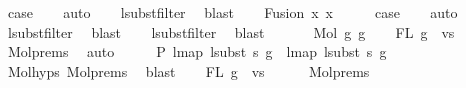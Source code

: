 \begin{isabellebody}
\ {\isacharquery}{\kern0pt}case\isanewline
\ \ \isamarkupfalse%
\ auto\isanewline
\ \ \isamarkupfalse%
\ lsubst{\isacharunderscore}{\kern0pt}filter\ \isamarkupfalse%
\ blast\isanewline
{}\isamarkupfalse%
\isanewline
\ \ \isamarkupfalse%
\ {\isacharparenleft}{\kern0pt}Fusion\ x{}\ x{}{\isacharparenright}{\kern0pt}\isanewline
\ \ \isamarkupfalse%
\ \isamarkupfalse%
\ {\isacharquery}{\kern0pt}case\isanewline
\ \ \isamarkupfalse%
\ auto\isanewline
\ \ \isamarkupfalse%
\ lsubst{\isacharunderscore}{\kern0pt}filter\ \isamarkupfalse%
\ blast\isanewline
\ \ \isamarkupfalse%
\ lsubst{\isacharunderscore}{\kern0pt}filter\ \isamarkupfalse%
\ blast\isanewline
\ \ \isamarkupfalse%
\isanewline
{}\isamarkupfalse%
\isanewline
\ \ \isamarkupfalse%
\ {\isacharparenleft}{\kern0pt}Mol\ g{}\ g{}{\isacharparenright}{\kern0pt}\isanewline
\isanewline
\ \ \isamarkupfalse%
\ {\isachardoublequoteopen}FL\ g{}\ {\isasymsubseteq}\ vs{\isachardoublequoteclose}\isanewline
\ \ \ \ \isamarkupfalse%
\ Mol{\isachardot}{\kern0pt}prems{\isacharparenleft}{\kern0pt}{}{\isacharparenright}{\kern0pt}\ \isamarkupfalse%
\ auto\isanewline
\ \ \isamarkupfalse%
\ \isamarkupfalse%
\ P{}{\isacharcolon}{\kern0pt}\ {\isachardoublequoteopen}lmap\ {\isacharparenleft}{\kern0pt}lsubst\ s{\isacharparenright}{\kern0pt}\ g{}\ {\isacharequal}{\kern0pt}\ lmap\ {\isacharparenleft}{\kern0pt}lsubst\ s{}{\isacharparenright}{\kern0pt}\ g{}{\isachardoublequoteclose}\isanewline
\ \ \ \ \isamarkupfalse%
\ Mol{\isachardot}{\kern0pt}hyps{\isacharparenleft}{\kern0pt}{}{\isacharparenright}{\kern0pt}\ Mol{\isachardot}{\kern0pt}prems{\isacharparenleft}{\kern0pt}{}{\isacharparenright}{\kern0pt}\ \isamarkupfalse%
\ blast\isanewline
\isanewline
\ \ \isamarkupfalse%
\ {\isachardoublequoteopen}FL\ g{}\ {\isasymsubseteq}\ vs{\isachardoublequoteclose}\isanewline
\ \ \ \ \isamarkupfalse%
\ Mol{\isachardot}{\kern0pt}prems{\isacharparenleft}{\kern0pt}{}{\isacharparenright}{\kern0pt}\ \isamarkupfalse%

\end{isabellebody}
